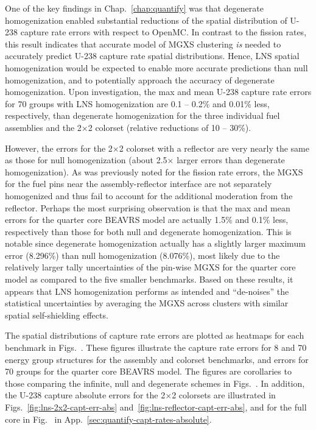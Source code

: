 One of the key findings in Chap.~\ref{chap:quantify} was that degenerate homogenization enabled substantial reductions of the spatial distribution of U-238 capture rate errors with respect to OpenMC. In contrast to the fission rates, this result indicates that accurate model of \ac{MGXS} clustering \textit{is} needed to accurately predict U-238 capture rate spatial distributions. Hence, \ac{LNS} spatial homogenization would be expected to enable more accurate predictions than null homogenization, and to potentially approach the accuracy of degenerate homogenization. Upon investigation, the max and mean U-238 capture rate errors for 70 groups with \ac{LNS} homogenization are 0.1  -- 0.2\% and 0.01\% less, respectively, than degenerate homogenization for the three individual fuel assemblies and the 2$\times$2 colorset (relative reductions of 10 -- 30\%).

However, the errors for the 2$\times$2 colorset with a reflector are very nearly the same as those for null homogenization (about 2.5$\times$ larger errors than degenerate homogenization). As was previously noted for the fission rate errors, the \ac{MGXS} for the fuel pins near the assembly-reflector interface are not separately homogenized and thus fail to account for the additional moderation from the reflector. Perhaps the most surprising observation is that the max and mean errors for the quarter core \ac{BEAVRS} model are actually 1.5\% and 0.1\% less, respectively than those for both null and degenerate homogenization. This is notable since degenerate homogenization actually has a slightly larger maximum error (8.296\%) than null homogenization (8.076\%), most likely due to the relatively larger tally uncertainties of the pin-wise \ac{MGXS} for the quarter core model as compared to the five smaller benchmarks. Based on these results, it appears that \ac{LNS} homogenization performs as intended and ``de-noises'' the statistical uncertainties by averaging the \ac{MGXS} across clusters with similar spatial self-shielding effects.

The spatial distributions of capture rate errors are plotted as heatmaps for each benchmark in Figs.~. These figures illustrate the capture rate errors for 8 and 70 energy group structures for the assembly and colorset benchmarks, and errors for 70 groups for the quarter core \ac{BEAVRS} model. The figures are corollaries to those comparing the infinite, null and degenerate schemes in Figs.~. In addition, the U-238 capture absolute errors for the 2$\times$2 colorsets are illustrated in Figs.~\ref{fig:lns-2x2-capt-err-abs} and~\ref{fig:lns-reflector-capt-err-abs}, and for the full core in Fig.~ in App.~\ref{sec:quantify-capt-rates-absolute}. 

